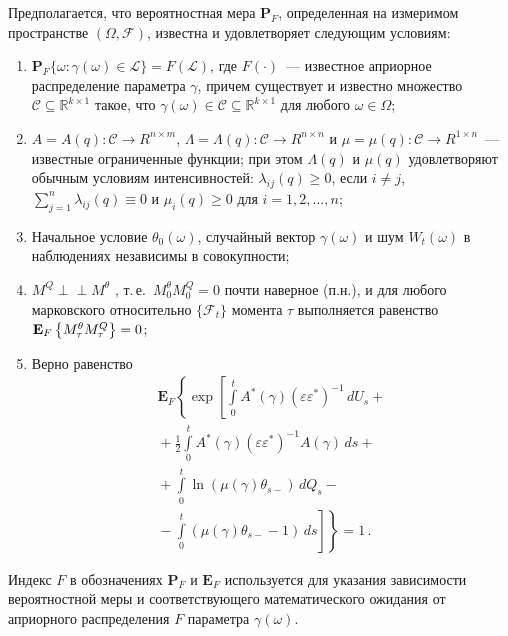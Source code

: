 \begin{multicols}{2}
 Предполагается, что вероятностная мера $\mathbf{P}_F$, определенная на измеримом пространстве $(\Omega, \mathcal{F})$,
 известна и удовлетворяет следующим условиям:
 \begin{enumerate}[I]
 \item \label{con_1}
 $\mathbf{P}_F\{\omega: \gamma(\omega) \in
\mathcal{L}\}=F(\mathcal{L})$, где $F(\cdot)$~--- известное
априорное распределение параметра $\gamma$, причем существует и
известно множество $\mathcal{C} \subseteq \mathbb{R}^{k \times 1}$
такое, что $\gamma(\omega) \in \mathcal{C} \subseteq \mathbb{R}^{k
\times 1}$ для любого $\omega \in \Omega$;
 \item \label{con_2}
 $A=A(q): \mathcal{C} \to R^{n \times m}$, $\Lambda=\Lambda(q): \mathcal{C} \to R^{n \times
 n}$ и $\mu=\mu(q): \mathcal{C} \to R^{1 \times n}$~--- известные
 ограниченные функции; при этом $\Lambda(q)$ и $\mu(q)$ удов\-ле\-тво\-ря\-ют обычным условиям интенсивностей:
 $\lambda_{ij}(q)\geqslant 0$, если $i \neq j$, $\sum_{j=1}^n\lambda_{ij}(q) \equiv
 0$ и $\mu_i(q)\geqslant 0$ для $i=1,2,\ldots,n$;
 \item \label{con_3}
 Начальное условие $\theta_0(\omega)$, случайный вектор $\gamma(\omega)$
 и шум $W_t(\omega)$ в наблюдениях независимы в совокупности;
 \item \label{con_4}
 $M^Q \perp \!\!\!\perp M^{\theta}$ \cite{l_sh}, т.\,е.\
 $M^{\theta}_0M^Q_0=0$ почти наверное (п.н.), и для любого марковского
 относительно $\{\mathcal{F}_t\}$ момента $\tau$ выполняется равенство
 $\mathbf{E}_{ F }\left\{ \mathop{M^{\theta}_{\tau}M^Q_{\tau}} \right\}=0 $;
 \item \label{con_5}
 Верно равенство
\begin{multline*}
\displaystyle \mathbf{E}_F\left\{\exp\left[
 \int\limits_0^t A^*(\gamma)(\varepsilon\varepsilon^*)^{-1}\,dU_s+{}\right. \right.\\
 {}+
 \frac{1}{2}\int\limits_0^t
 A^*(\gamma)(\varepsilon\varepsilon^*)^{-1}A(\gamma)\,ds
 + {}\\
 {}+ \int\limits_0^t \ln (\mu(\gamma)\theta_{s-})\,dQ_s -{}\\
 \left.\left.{}- \int\limits_0^t (\mu(\gamma)\theta_{s-}-1)\,ds
 \right]\right\}\!=\!1\,.
\end{multline*}
 \end{enumerate}
 Индекс $F$ в обозначениях $\mathbf{P}_F$ и $\mathbf{E}_F$ используется для
 указания зависимости вероятностной меры и соответствующего математического
 ожидания от априорного распределения $F$ параметра $\gamma(\omega)$.


\end{multicols}
